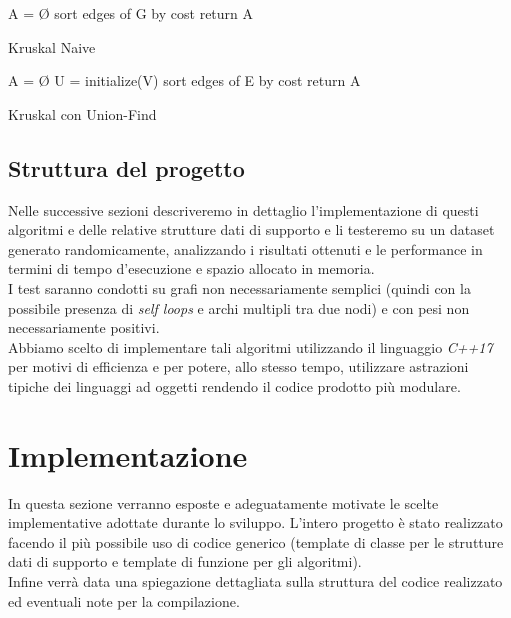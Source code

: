 \documentclass[]{article}
\begin{document}
\begin{algorithm}[H]
	\SetAlgoLined
	\DontPrintSemicolon
	A = Ø\;
	sort edges of G by cost\;
	return A\;
	\caption{Kruskal Naive}
\end{algorithm}

\begin{algorithm}[H]
	\SetAlgoLined
	\DontPrintSemicolon
	A = Ø\;
	U = initialize(V)\;
	sort edges of E by cost\;
	return A\;
	\caption{Kruskal con Union-Find}
\end{algorithm}
\subsection{Struttura del progetto}
Nelle successive sezioni descriveremo in dettaglio l'implementazione di questi algoritmi e delle relative strutture dati di supporto e li testeremo su un dataset generato randomicamente, analizzando i risultati ottenuti e le performance in termini di tempo d'esecuzione e spazio allocato in memoria.\\
I test saranno condotti su grafi non necessariamente semplici (quindi con la possibile presenza di \textit{self loops} e archi multipli tra due nodi) e con pesi non necessariamente positivi.\\
Abbiamo scelto di implementare tali algoritmi utilizzando il linguaggio \textit{C++17} per motivi di efficienza e per potere, allo stesso tempo, utilizzare astrazioni tipiche dei linguaggi ad oggetti rendendo il codice prodotto più modulare.
\section{Implementazione}
In questa sezione verranno esposte e adeguatamente motivate le scelte implementative adottate durante lo sviluppo. L'intero progetto è stato realizzato facendo il più possibile uso di codice generico (template di classe per le strutture dati di supporto e template di funzione per gli algoritmi).\\
Infine verrà data una spiegazione dettagliata sulla struttura del codice realizzato ed eventuali note per la compilazione.
\end{document}
